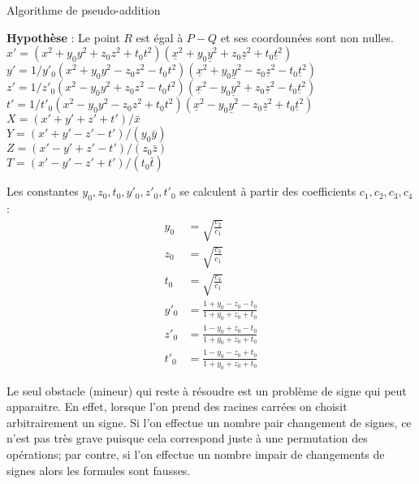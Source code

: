 \documentclass[a4paper]{article}
\theoremstyle{definition}
\theoremstyle{remark}
\numberwithin{equation}{section}
\begin{document}
\begin{algorithm}
\label{ADD2}
\caption{Algorithme de pseudo-addition}
\textbf{Hypothèse} : Le point $R$ est égal à $P-Q$ et ses coordonnées sont non nulles. \\
$x' = (x^2 + y_0y^2 + z_0z^2 + t_0t^2)(\underline{x}^2 + y_0\underline{y}^2 + z_0\underline{z}^2 + t_0\underline{t}^2)$ \\
$y' = 1/y'_0(x^2 + y_0y^2 - z_0z^2 - t_0t^2)(\underline{x}^2 + y_0\underline{y}^2 - z_0\underline{z}^2 - t_0\underline{t}^2)$ \\
$z' = 1/z'_0(x^2 - y_0y^2 + z_0z^2 - t_0t^2)(\underline{x}^2 - y_0\underline{y}^2 + z_0\underline{z}^2 - t_0\underline{t}^2)$ \\
$t' = 1/t'_0(x^2 - y_0y^2 - z_0z^2 + t_0t^2)(\underline{x}^2 - y_0\underline{y}^2 - z_0\underline{z}^2 + t_0\underline{t}^2)$ \\
$X = (x' + y' + z' + t')/\bar{x}$ \\
$Y = (x' + y' - z' - t')/(y_0\bar{y})$ \\
$Z = (x' - y' + z' - t')/(z_0\bar{z})$ \\
$T = (x' - y' - z' + t')/(t_0\bar{t})$ \\
\end{algorithm}
Les constantes $y_0,z_0,t_0,y'_0,z'_0,t'_0$ se calculent à partir des coefficients $c_1,c_2,c_3,c_4$ :
\begin{align*}
y_0 &= \sqrt{\frac{c_2}{c_1}} \\
z_0 &= \sqrt{\frac{c_3}{c_1}} \\
t_0 &= \sqrt{\frac{c_4}{c_1}} \\
y'_0 &= \frac{1+y_0-z_0-t_0}{1+y_0+z_0+t_0} \\
z'_0 &= \frac{1-y_0+z_0-t_0}{1+y_0+z_0+t_0} \\
t'_0 &= \frac{1-y_0-z_0+t_0}{1+y_0+z_0+t_0}
\end{align*}

Le seul obstacle (mineur) qui reste à résoudre est un problème de signe qui peut apparaitre. En effet, lorsque l'on prend des racines carrées on choisit arbitrairement un signe. Si l'on effectue un nombre pair changement de signes, ce n'est pas très grave puisque cela correspond juste à une permutation des opérations; par contre, si l'on effectue un nombre impair de changements de signes alors les formules sont fausses.
\end{document}
